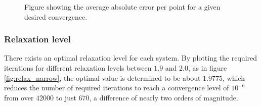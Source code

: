\begin{figure}[h!]
\centering
\setlength\fboxsep{0pt}
\setlength\fboxrule{0.5pt}
\label{fig:convergence_accuracy}
\caption{Figure showing the average absolute error per point for a given desired convergence.}
\end{figure}

\subsubsection{Relaxation level}
There exists an optimal relaxation level for each system. By plotting the required iterations for different relaxation levels between $1.9$ and $2.0$, as in figure \ref{fig:relax_narrow}, the optimal value is determined to be about $1.9775$, which reduces the number of required iterations to reach a convergence level of $10^{-6}$ from over $42000$ to just $670$, a difference of nearly two orders of magnitude. 

